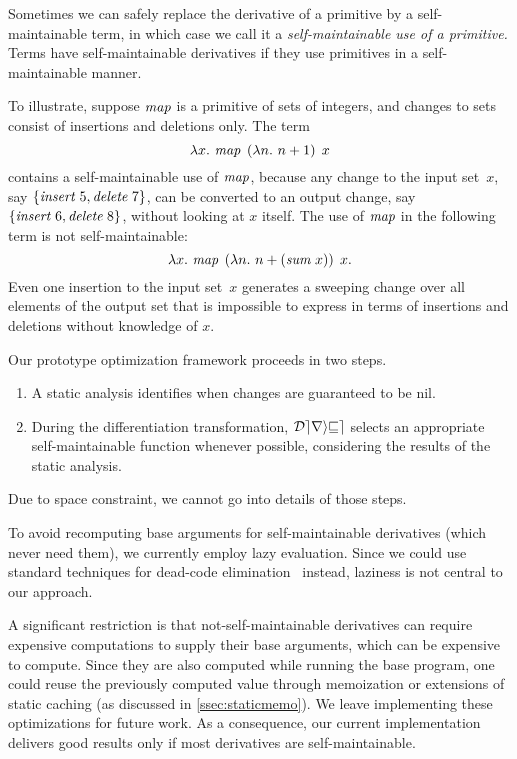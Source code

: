 \begin{oldSec}
Sometimes we can safely replace the derivative of a primitive by
a self-maintainable term, in which case we call it a
\emph{self-maintainable use of a primitive.}
Terms have self-maintainable derivatives if they use
primitives in a self-maintainable manner.

%
To illustrate, suppose $\mathit{map}$ is a primitive of sets of
integers,
and changes to sets consist of insertions and deletions only.
The term
\[
\Lam x {\Map {\Lam*n {n + 1}} x}
\]
contains a self-maintainable use of $\mathit{map}$, because any change to
the input set~$x$, say $\{\App\INSERT5, \App\DELETE7\}$, can be
converted to an output change, say $\{\App\INSERT6,
\App\DELETE8\}$, without looking at $x$ itself. The use of $\mathit{map}$
in the following term is not self-maintainable:
\[
\Lam x {\Map {\Lam*n {n + \Sum* x}} x}.
\]
Even one insertion to the input set~$x$ generates a sweeping
change over all elements of the output set that is impossible to
express in terms of insertions and deletions without knowledge of $x$.

Our prototype optimization framework proceeds in two steps.
\begin{enumerate}
\item A static analysis identifies when changes are guaranteed to be nil.
\item During the differentiation transformation, $\mathcal{Derive}$
selects an appropriate self-maintainable function whenever possible,
considering the results of the static analysis.
\end{enumerate}
Due to space constraint, we cannot go into details of those
steps.
%
%
\end{oldSec}

To avoid recomputing base arguments for self-maintainable derivatives
(which never need them), we
currently employ lazy evaluation.  Since we could use standard techniques for dead-code
elimination~\citep{Appel97} instead, laziness is not central to our
approach.

A significant restriction is that not-self-maintainable derivatives can require expensive computations to supply their base
arguments, which can be expensive to compute. Since they are also
computed while running the base program, one could reuse the previously
computed value through memoization or extensions of static
caching (as discussed in \cref{ssec:staticmemo}). We leave implementing these optimizations for future work. As a consequence,
our current implementation delivers good results only if
most derivatives are self-maintainable.


